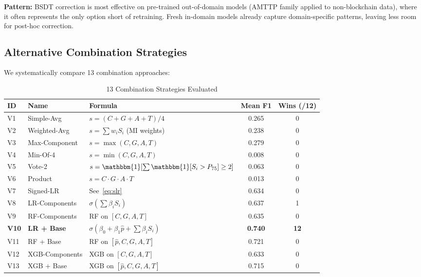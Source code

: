 \documentclass[journal]{IEEEtran}
\newcommand{\ind}{\mathbbm{1}}
\begin{document}
\textbf{Pattern:} BSDT correction is most effective on pre-trained out-of-domain models (AMTTP family applied to non-blockchain data), where it often represents the only option short of retraining. Fresh in-domain models already capture domain-specific patterns, leaving less room for post-hoc correction.

\subsection{Alternative Combination Strategies}
\label{ssec:strategies}

We systematically compare 13 combination approaches:

\begin{table}[!t]
\centering
\caption{13 Combination Strategies Evaluated}
\label{tab:strategies}
\begin{tabular}{@{}llp{6cm}cc@{}}
\toprule
\textbf{ID} & \textbf{Name} & \textbf{Formula} & \textbf{Mean F1} & \textbf{Wins (/12)} \\
\midrule
V1  & Simple-Avg          & $s = (C+G+A+T)/4$                      & 0.265 & 0 \\
V2  & Weighted-Avg         & $s = \sum w_i S_i$ (MI weights)        & 0.238 & 0 \\
V3  & Max-Component        & $s = \max(C,G,A,T)$                    & 0.279 & 0 \\
V4  & Min-Of-4             & $s = \min(C,G,A,T)$                    & 0.008 & 0 \\
V5  & Vote-2               & $s = \ind[\sum \ind[S_i > P_{75}] \geq 2]$ & 0.063 & 0 \\
V6  & Product              & $s = C \cdot G \cdot A \cdot T$        & 0.013 & 0 \\
V7  & Signed-LR            & See~\eqref{eq:slr}                     & 0.634 & 0 \\
V8  & LR-Components        & $\sigma(\sum \beta_i S_i)$             & 0.637 & 1 \\
V9  & RF-Components        & RF on $[C,G,A,T]$                      & 0.635 & 0 \\
\textbf{V10} & \textbf{LR + Base} & $\sigma(\beta_0 + \beta_1 \hat{p} + \sum \beta_i S_i)$ & \textbf{0.740} & \textbf{12} \\
V11 & RF + Base             & RF on $[\hat{p},C,G,A,T]$             & 0.721 & 0 \\
V12 & XGB-Components       & XGB on $[C,G,A,T]$                     & 0.633 & 0 \\
V13 & XGB + Base            & XGB on $[\hat{p},C,G,A,T]$            & 0.715 & 0 \\
\bottomrule
\end{tabular}
\end{table}
\end{document}
